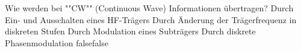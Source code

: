     {Wie werden bei ""CW"" (Continuous Wave) Informationen übertragen?}
    {Durch Ein- und Ausschalten eines HF-Trägers}
    {Durch Änderung der Trägerfrequenz in diskreten Stufen}
    {Durch Modulation eines Subträgers}
    {Durch diskrete Phasenmodulation}
    {false}{false}
